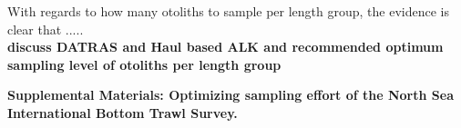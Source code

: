 \documentclass[a4paper 12pt]{article}
\numberwithin{equation}{section}
\renewcommand{\theequation} {\arabic{section}.\arabic{equation}}
\begin{document}
With regards to how many otoliths to sample per length group, the evidence is clear that .....\\

{\bf discuss DATRAS and Haul based ALK and recommended optimum sampling level of otoliths per length group}




\clearpage








\clearpage




\clearpage


\begin{center}
\textbf{\Large Supplemental Materials: Optimizing sampling effort of the North Sea International Bottom Trawl Survey.}
\end{center}
\setcounter{section}{0}
\setcounter{equation}{0}
\setcounter{figure}{0}
\setcounter{table}{0}
\setcounter{page}{1}
\makeatletter
\renewcommand{\thesection}{S\arabic{section}}
\renewcommand{\theequation}{S\arabic{section}.\arabic{equation}}
\renewcommand{\thefigure}{S\arabic{figure}}
\renewcommand{\bibnumfmt}[1]{[S#1]}
\renewcommand{\citenumfont}[1]{S#1}

\setcounter{table}{0}
\end{document}
